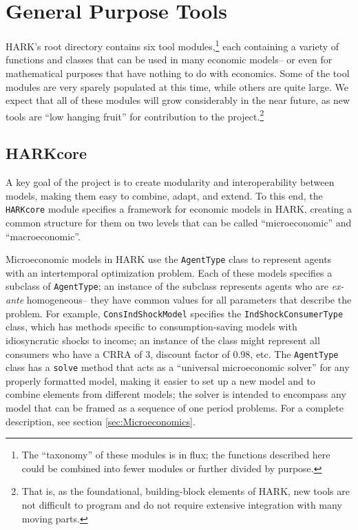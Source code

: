 \documentclass[12pt,titlepage,letterpaper]{econtex}
\begin{document}
\newpage

\section{General Purpose Tools}\label{sec:GeneralPurposeTools}

HARK's root directory contains six tool modules,\footnote{The ``taxonomy'' of these modules is in flux; the functions described here could be combined into fewer modules or further divided by purpose.} each containing a variety of functions and classes that can be used in many economic models-- or even for mathematical purposes that have nothing to do with economics.  Some of the tool modules are very sparely populated at this time, while others are quite large.  We expect that all of these modules will grow considerably in the near future, as new tools are ``low hanging fruit'' for contribution to the project.\footnote{That is, as the foundational, building-block elements of HARK, new tools are not difficult to program and do not require extensive integration with many moving parts.}

\subsection{HARKcore}\label{sec:HARKcore}

A key goal of the project is to create modularity and interoperability between models, making them easy to combine, adapt, and extend.  To this end, the \texttt{HARKcore} module specifies a framework for economic models in HARK, creating a common structure for them on two levels that can be called ``microeconomic'' and ``macroeconomic''.

Microeconomic models in HARK use the \texttt{AgentType} class to represent agents with an intertemporal optimization problem.  Each of these models specifies a subclass of \texttt{AgentType}; an instance of the subclass represents agents who are \textit{ex-ante} homogeneous-- they have common values for all parameters that describe the problem.  For example, \texttt{ConsIndShockModel} specifies the \texttt{IndShockConsumerType} class, which has methods specific to consumption-saving models with idiosyncratic shocks to income; an instance of the class might represent all consumers who have a CRRA of 3, discount factor of 0.98, etc.  The \texttt{AgentType} class has a \texttt{solve} method that acts as a ``universal microeconomic solver'' for any properly formatted model, making it easier to set up a new model and to combine elements from different models; the solver is intended to encompass any model that can be framed as a sequence of one period problems.  For a complete description, see section \ref{sec:Microeconomics}.
\end{document}
